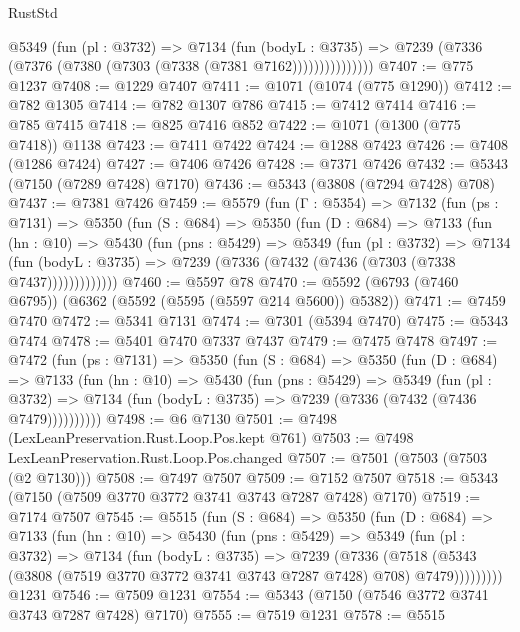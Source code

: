 \begin{lexlean}{RustStd}
\begin{coremodule}
                @5349
                  (fun (pl : @3732) =>
                  @7134
                    (fun (bodyL : @3735) =>
                    @7239 (@7336 (@7376 (@7380 (@7303 (@7338 (@7381 @7162)))))))))))))))
@7407 := @775 @1237
@7408 := @1229 @7407
@7411 := @1071 (@1074 (@775 @1290))
@7412 := @782 @1305
@7414 := @782 @1307 @786
@7415 := @7412 @7414
@7416 := @785 @7415
@7418 := @825 @7416 @852
@7422 := @1071 (@1300 (@775 @7418)) @1138
@7423 := @7411 @7422
@7424 := @1288 @7423
@7426 := @7408 (@1286 @7424)
@7427 := @7406 @7426
@7428 := @7371 @7426
@7432 := @5343 (@7150 (@7289 @7428) @7170)
@7436 := @5343 (@3808 (@7294 @7428) @708)
@7437 := @7381 @7426
@7459 := @5579
    (fun (Γ : @5354) =>
    @7132
      (fun (ps : @7131) =>
      @5350
        (fun (S : @684) =>
        @5350
          (fun (D : @684) =>
          @7133
            (fun (hn : @10) =>
            @5430
              (fun (pns : @5429) =>
              @5349
                (fun (pl : @3732) =>
                @7134
                  (fun (bodyL : @3735) =>
                  @7239 (@7336 (@7432 (@7436 (@7303 (@7338 @7437)))))))))))))
@7460 := @5597 @78
@7470 := @5592 (@6793 (@7460 @6795)) (@6362 (@5592 (@5595 (@5597 @214 @5600)) @5382))
@7471 := @7459 @7470
@7472 := @5341 @7131
@7474 := @7301 (@5394 @7470)
@7475 := @5343 @7474
@7478 := @5401 @7470 @7337 @7437
@7479 := @7475 @7478
@7497 := @7472
    (fun (ps : @7131) =>
    @5350
      (fun (S : @684) =>
      @5350
        (fun (D : @684) =>
        @7133
          (fun (hn : @10) =>
          @5430
            (fun (pns : @5429) =>
            @5349
              (fun (pl : @3732) =>
              @7134 (fun (bodyL : @3735) => @7239 (@7336 (@7432 (@7436 @7479))))))))))
@7498 := @6 @7130
@7501 := @7498 (LexLeanPreservation.Rust.Loop.Pos.kept @761)
@7503 := @7498 LexLeanPreservation.Rust.Loop.Pos.changed
@7507 := @7501 (@7503 (@7503 (@2 @7130)))
@7508 := @7497 @7507
@7509 := @7152 @7507
@7518 := @5343 (@7150 (@7509 @3770 @3772 @3741 @3743 @7287 @7428) @7170)
@7519 := @7174 @7507
@7545 := @5515
    (fun (S : @684) =>
    @5350
      (fun (D : @684) =>
      @7133
        (fun (hn : @10) =>
        @5430
          (fun (pns : @5429) =>
          @5349
            (fun (pl : @3732) =>
            @7134
              (fun (bodyL : @3735) =>
              @7239
                (@7336
                  (@7518
                    (@5343 (@3808 (@7519 @3770 @3772 @3741 @3743 @7287 @7428) @708) @7479)))))))))
    @1231
@7546 := @7509 @1231
@7554 := @5343 (@7150 (@7546 @3772 @3741 @3743 @7287 @7428) @7170)
@7555 := @7519 @1231
@7578 := @5515

\end{coremodule}
\end{lexlean}
